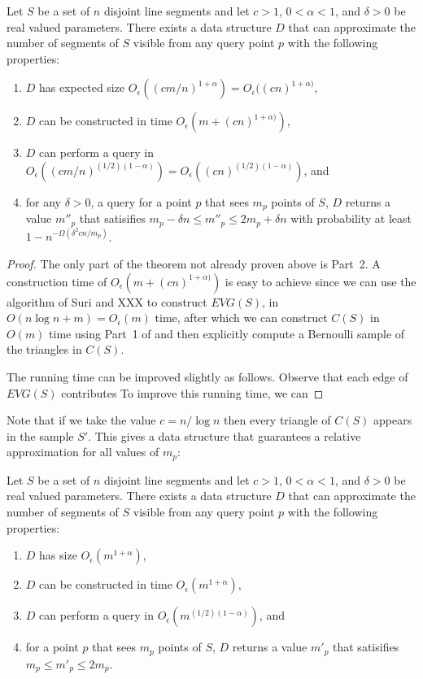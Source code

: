 \documentclass{patmorin}
\newcommand{\EVG}{\mathit{EVG}}
\newcommand{\Oe}{O_\epsilon}
\begin{document}
\begin{thm}
  Let $S$ be a set of $n$ disjoint line segments and let $c>1$, $0 <
  \alpha < 1$, and $\delta > 0$ be real valued parameters.  There exists
  a data structure $D$ that can approximate the number of segments of $S$
  visible from any query point $p$ with the following properties:
  \begin{enumerate}
    \item $D$ has expected size $\Oe((cm/n)^{1+\alpha}) =
          \Oe((cn)^{1+\alpha)}$,
    \item $D$ can be constructed in time
          $\Oe(m + (cn)^{1+\alpha)})$,
    \item $D$ can perform a query in $\Oe((cm/n)^{(1/2)(1-\alpha)}) =
          \Oe((cn)^{(1/2)(1-\alpha)})$, and
    \item for any $\delta > 0$, a query for a point $p$ that sees $m_p$
          points of $S$, $D$ returns a value $m''_p$ that satisifies 
          $m_p - \delta n \le m''_p \le 2m_p + \delta n$ with 
          probability at least $1-n^{-\Omega(\delta^2 cn/m_p)}$.
  \end{enumerate}
\end{thm}

\begin{proof}
The only part of the theorem not already proven above is Part~2.
A construction time of $\Oe(m + (cn)^{1+\alpha)})$ is easy to achieve
since we can use the algorithm of Suri and XXX \cite{} to construct
$\EVG(S)$, in $O(n\log n + m) = \Oe(m)$ time, after which we can
construct $C(S)$ in $O(m)$ time using Part~1 of 
and then explicitly compute a Bernoulli sample of the triangles in $C(S)$.

The running time can be improved slightly as follows.
Observe that each edge of $\EVG(S)$ contributes 
To improve this running time, we can 
\end{proof}


Note that if we take the value $c= n/\log n$ then every triangle of $C(S)$
appears in the sample $S'$.  This gives a data structure that guarantees a
relative approximation for all values of $m_p$:

\begin{cor}
  Let $S$ be a set of $n$ disjoint line segments and let $c>1$, $0 <
  \alpha < 1$, and $\delta > 0$ be real valued parameters.  There exists
  a data structure $D$ that can approximate the number of segments of $S$
  visible from any query point $p$ with the following properties:
  \begin{enumerate}
    \item $D$ has size $\Oe(m^{1+\alpha})$,
    \item $D$ can be constructed in time $\Oe(m^{1+\alpha})$,
    \item $D$ can perform a query in $\Oe(m^{(1/2)(1-\alpha)})$, and
    \item for a point $p$ that sees $m_p$
          points of $S$, $D$ returns a value $m'_p$ that satisifies 
          $m_p \le m'_p \le 2m_p$.
  \end{enumerate}
\end{cor}
\end{document}
